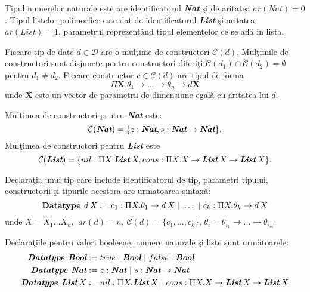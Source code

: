 \begin{example}
Tipul numerelor naturale este are identificatorul \emph{\textbf{Nat}} \c si de aritatea $ar(Nat) = 0$. Tipul listelor polimorfice este dat de identificatorul \textbf{\emph{List}} \c si aritatea $ar(List) = 1$, parametrul reprezent\^ and tipul elementelor ce se afl\u a in lista.
\end{example}

Fiecare tip de date $d \in \mathcal{D}$ are o mul\c time de constructori $\mathcal{C}(d)$. Mul\c timile de constructori sunt disjuncte pentru constructori diferi\c ti $\mathcal{C}(d_1) \cap \mathcal{C}(d_2) = \emptyset $ pentru $d_1 \neq d_2$. Fiecare constructor $c\in \mathcal{C}(d)$ are tipul de forma
$$ \Pi \textbf{X}.\theta_1\to\dots\to\theta_n \to d \textbf{X}$$
unde $\textbf{X}$ este un vector de parametrii de dimensiune egal\u a cu aritatea lui $d$.

\begin{example}
\label{nat_def} Multimea de constructori pentru \emph{\textbf{Nat}} este:
$$\mathcal{C}(\emph{\textbf{Nat}})=\{z : \emph{\textbf{Nat}} , s : \emph{\textbf{Nat}} \to \emph{\textbf{Nat}} \}.$$
Mul\c timea de constructori pentru \emph{\textbf{List}} este
$$\mathcal{C}(\emph{\textbf{List}})=\{ nil : \Pi X. \emph{\textbf{List}}\hspace{2pt} X , cons : \Pi X . X \to \emph{\textbf{List}}\hspace{2pt} X \to \emph{\textbf{List}}\hspace{2pt} X\}.$$
\end{example}

Declara\c tia unui tip care include identificatorul de tip, parametri tipului, constructorii \c si tipurile acestora are urmatoarea sintax\u a:
$$ \textbf{Datatype  } d\hspace{2pt} X := c_1 : \Pi X . \theta_1 \to d \hspace{2pt} X \ | \
                                 \ldots \ |\
                                 c_k : \Pi X . \theta_k \to d\hspace{2pt} X
$$
unde $X = X_1 \dots X_n$, $\ ar(d) = n$, $\mathcal{C}(d) = \{c_1, \dots,c_k\}$, $\theta_i = \theta_{i_1} \to \dots \to \theta_{i_m} $.
\begin{example}
Declara\c tiile pentru valori booleene, numere naturale \c si liste sunt urm\u atoarele:
\begin{align*}
 \textbf{\emph{Datatype}  } \emph{\textbf{Bool}}       &:= true : \emph{\textbf{Bool}} \ |\  false : \emph{\textbf{Bool}} \\
 \textbf{\emph{Datatype}  } \emph{\textbf{Nat}}        &:= z : \emph{\textbf{Nat}} \ |\ s : \emph{\textbf{Nat}} \to \emph{\textbf{Nat}} \\
 \textbf{\emph{Datatype}  } \emph{\textbf{List}}\hspace{2pt} X &:= nil : \Pi X. \emph{\textbf{List}}\hspace{2pt} X\ |\ cons :  \Pi X.X \to \emph{\textbf{List}}\hspace{2pt} X \to \emph{\textbf{List}} \hspace{2pt} X
\end{align*}
\end{example}

